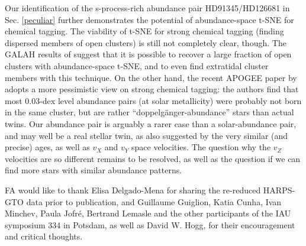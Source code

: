 \documentclass{aa}  %
\begin{document}
Our identification of the s-process-rich abundance pair HD91345/HD126681 in Sec. \ref{peculiar} further demonstrates the potential of abundance-space t-SNE for chemical tagging. The viability of t-SNE for strong chemical tagging (finding dispersed members of open clusters) is still not completely clear, though. The GALAH results of \citet{Kos2018} suggest that it is possible to recover a large fraction of open clusters with abundance-space t-SNE, and to even find extratidal cluster members with this technique. On the other hand, the recent APOGEE paper by \citet{Ness2018} adopts a more pessimistic view on strong chemical tagging: the authors find that most 0.03-dex level abundance pairs (at solar metallicity) were probably not born in the same cluster, but are rather ``doppelg\"anger-abundance'' stars than actual twins. Our abundance pair is arguably a rarer case than a solar-abundance pair, and may well be a real stellar twin, as also suggested by the very similar (and precise) ages, as well as  $v_X$ and $v_Y$ space velocities. The question why the $v_Z$ velocities are so different remains to be resolved, as well as the question if we can find more stars with similar abundance patterns.






\begin{acknowledgements}
FA would like to thank Elisa Delgado-Mena for sharing the re-reduced HARPS-GTO data prior to publication, and Guillaume Guiglion, Katia Cunha, Ivan Minchev, Paula Jofr\'e, Bertrand Lemasle and the other participants of the IAU symposium 334 in Potsdam, as well as David W. Hogg, for their encouragement and critical thoughts. 

\end{acknowledgements}

\end{document}
